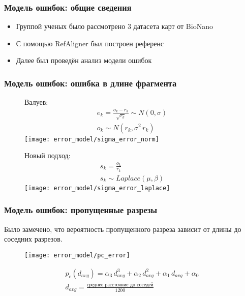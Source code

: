 \begin{frame}
\frametitle{Модель ошибок\nocite{error_model}: общие сведения}
\begin{itemize}
  \item Группой ученых было рассмотрено 3 датасета карт от BioNano
  \item С помощью RefAligner был построен референс
  \item Далее был проведён анализ модели ошибок
\end{itemize}
\end{frame}

\begin{frame}
\frametitle{Модель ошибок: ошибка в длине фрагмента}


\begin{figure}
\centering
\begin{minipage}{.5\textwidth}
  Валуев:
  \begin{gather*}
  e_k = \frac{o_k - r_k}{\sqrt{r_k}} \sim N(0, \sigma) \\
  o_k \sim N(r_k, \sigma^2 \, r_k)
  \end{gather*}
  \centering
  \texttt{[image: error\_model/sigma\_error\_norm]}
\end{minipage}%
\begin{minipage}{.5\textwidth}
  Новый подход:
  \begin{gather*}
  s_k = \frac{o_k}{r_k} \\
  s_k \sim Laplace(\mu, \beta)
  \end{gather*}
  \centering
  \texttt{[image: error\_model/sigma\_error\_laplace]}
\end{minipage}
\end{figure}
\end{frame}

\begin{frame}
\frametitle{Модель ошибок: пропущенные разрезы}
Было замечено, что вероятность пропущенного разреза зависит от длины до соседних разрезов.
\begin{figure}
  \centering
  \texttt{[image: error\_model/pc\_error]}
\end{figure}
\begin{gather*}
p_c (d_{avg}) = \alpha_3 \, d_{avg}^3 + \alpha_2 \, d_{avg}^2 +  \alpha_1 \, d_{avg} + \alpha_0 \\
d_{avg} = \frac{\text{среднее расстояние до соседей}}{1200}
\end{gather*}
\end{frame}

